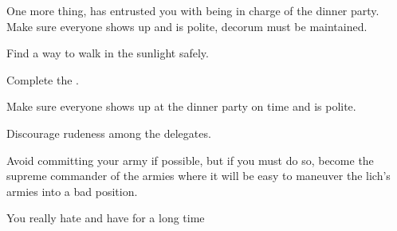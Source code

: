 \documentclass[char]{guildcamp2}
\begin{document}
One more thing, \cOnyx{} has entrusted you with being in charge of the dinner party. Make sure everyone shows up and is polite, decorum must be maintained.   


\begin{itemz}[Goals]
  \item Find a way to walk in the sunlight safely.
  \item Complete the \gEnslaveRitual{}.
  \item Make sure everyone shows up at the dinner party on time and is polite.
	\item Discourage rudeness among the delegates.
	\item Avoid committing your army if possible, but if you must do so, become the supreme commander of the armies where it will be easy to maneuver the lich's armies into a bad position.
\end{itemz}


\begin{contacts}
  \contact{\cLich{}} You really hate \cLich{\them} and have for a long time
\end{contacts}


\end{document}
